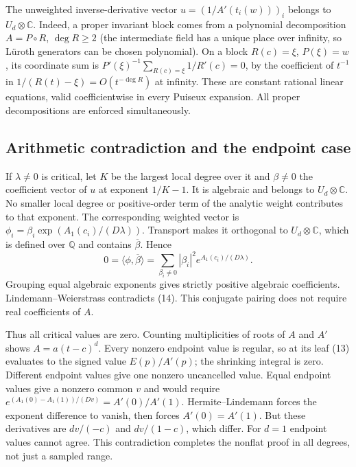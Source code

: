 \documentclass[11pt]{article}
\newcommand{\C}{\mathbb C}
\newcommand{\Q}{\mathbb Q}
\begin{document}
The unweighted inverse-derivative vector
$u=(1/A'(t_i(w)))_i$ belongs to $U_d\otimes\C$.
Indeed, a proper invariant block comes from a polynomial decomposition
$A=P\circ R$, $\deg R\ge2$ (the intermediate field has a unique place
over infinity, so L\"uroth generators can be chosen polynomial).
On a block $R(c)=\xi$, $P(\xi)=w$, its coordinate sum is
$P'(\xi)^{-1}\sum_{R(c)=\xi}1/R'(c)=0$, by the coefficient of $t^{-1}$
in $1/(R(t)-\xi)=O(t^{-\deg R})$ at infinity. These are constant rational
linear equations, valid coefficientwise in every Puiseux expansion.
All proper decompositions are enforced simultaneously.

\subsection{Arithmetic contradiction and the endpoint case}
If $\lambda\ne0$ is critical, let $K$ be the largest local degree over it
and $\beta\ne0$ the coefficient vector of $u$ at exponent $1/K-1$.
It is algebraic and belongs to $U_d\otimes\C$.
No smaller local degree or positive-order term of the analytic weight
contributes to that exponent. The corresponding weighted vector is
$\phi_i=\beta_i\exp(A_1(c_i)/(D\lambda))$. Transport makes it orthogonal
to $U_d\otimes\C$, which is defined over $\Q$ and contains
$\overline\beta$. Hence
\[
 0=\langle\phi,\overline\beta\rangle
   =\sum_{\beta_i\ne0}|\beta_i|^2e^{A_1(c_i)/(D\lambda)}.    \tag{14}
\]
Grouping equal algebraic exponents gives strictly positive algebraic
coefficients. Lindemann--Weierstrass contradicts (14). This conjugate
pairing does not require real coefficients of $A$.

Thus all critical values are zero. Counting multiplicities of roots of
$A$ and $A'$ shows $A=a(t-c)^d$. Every nonzero endpoint value is regular,
so at its leaf (13) evaluates to the signed value $E(p)/A'(p)$; the
shrinking integral is zero. Different endpoint values give one nonzero
uncancelled value. Equal endpoint values give a nonzero common $v$ and
would require $e^{(A_1(0)-A_1(1))/(Dv)}=A'(0)/A'(1)$.
Hermite--Lindemann forces the exponent difference to vanish, then forces
$A'(0)=A'(1)$. But these derivatives are $dv/(-c)$ and $dv/(1-c)$,
which differ. For $d=1$ endpoint values cannot agree. This contradiction
completes the nonflat proof in all degrees, not just a sampled range.
\end{document}
